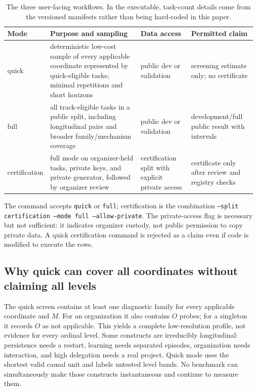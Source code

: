 \documentclass[11pt]{article}
\theoremstyle{definition}
\begin{document}
\begin{table}[H]
\centering\small
\begin{tabularx}{\textwidth}{@{}lYYY@{}}
\toprule
Mode & Purpose and sampling & Data access & Permitted claim \\
\midrule
quick & deterministic low-cost sample of every applicable coordinate represented by quick-eligible tasks; minimal repetitions and short horizons & public dev or validation & screening estimate only; no certificate \\
full & all track-eligible tasks in a public split, including longitudinal pairs and broader family/mechanism coverage & public dev or validation & development/full public result with intervals \\
certification & full mode on organizer-held tasks, private keys, and private generator, followed by organizer review & certification split with explicit private access & certificate only after review and registry checks \\
\bottomrule
\end{tabularx}
\caption{The three user-facing workflows. In the executable, task-count details come from the versioned manifests rather than being hard-coded in this paper.}
\label{tab:modes}
\end{table}

The command accepts \texttt{quick} or \texttt{full}; certification is the combination \texttt{--split certification --mode full --allow-private}. The private-access flag is necessary but not sufficient: it indicates organizer custody, not public permission to copy private data. A quick certification command is rejected as a claim even if code is modified to execute the rows.

\subsection{Why quick can cover all coordinates without claiming all levels}

The quick screen contains at least one diagnostic family for every applicable coordinate and $M$. For an organization it also contains $O$ probes; for a singleton it records $O$ as not applicable. This yields a complete low-resolution profile, not evidence for every ordinal level. Some constructs are irreducibly longitudinal: persistence needs a restart, learning needs separated episodes, organization needs interaction, and high delegation needs a real project. Quick mode uses the shortest valid causal unit and labels untested level bands. No benchmark can simultaneously make those constructs instantaneous and continue to measure them.
\end{document}
